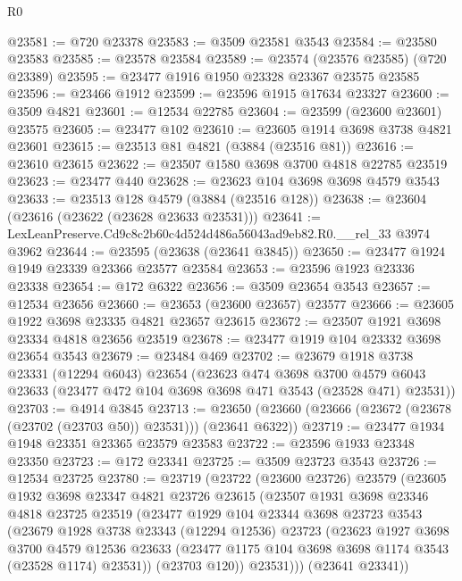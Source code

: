\begin{lexlean}{R0}
\begin{coremodule}
@23581 := @720 @23378
@23583 := @3509 @23581 @3543
@23584 := @23580 @23583
@23585 := @23578 @23584
@23589 := @23574 (@23576 @23585) (@720 @23389)
@23595 := @23477 @1916 @1950 @23328 @23367 @23575 @23585
@23596 := @23466 @1912
@23599 := @23596 @1915 @17634 @23327
@23600 := @3509 @4821
@23601 := @12534 @22785
@23604 := @23599 (@23600 @23601) @23575
@23605 := @23477 @102
@23610 := @23605 @1914 @3698 @3738 @4821 @23601
@23615 := @23513 @81 @4821 (@3884 (@23516 @81))
@23616 := @23610 @23615
@23622 := @23507 @1580 @3698 @3700 @4818 @22785 @23519
@23623 := @23477 @440
@23628 := @23623 @104 @3698 @3698 @4579 @3543
@23633 := @23513 @128 @4579 (@3884 (@23516 @128))
@23638 := @23604 (@23616 (@23622 (@23628 @23633 @23531)))
@23641 := LexLeanPreserve.Cd9c8c2b60c4d524d486a56043ad9eb82.R0.__rel_33 @3974 @3962
@23644 := @23595 (@23638 (@23641 @3845))
@23650 := @23477 @1924 @1949 @23339 @23366 @23577 @23584
@23653 := @23596 @1923 @23336 @23338
@23654 := @172 @6322
@23656 := @3509 @23654 @3543
@23657 := @12534 @23656
@23660 := @23653 (@23600 @23657) @23577
@23666 := @23605 @1922 @3698 @23335 @4821 @23657 @23615
@23672 := @23507 @1921 @3698 @23334 @4818 @23656 @23519
@23678 := @23477 @1919 @104 @23332 @3698 @23654 @3543
@23679 := @23484 @469
@23702 := @23679
    @1918
    @3738
    @23331
    (@12294 @6043)
    @23654
    (@23623
      @474
      @3698
      @3700
      @4579
      @6043
      @23633
      (@23477 @472 @104 @3698 @3698 @471 @3543 (@23528 @471) @23531))
@23703 := @4914 @3845
@23713 := @23650 (@23660 (@23666 (@23672 (@23678 (@23702 (@23703 @50)) @23531))) (@23641 @6322))
@23719 := @23477 @1934 @1948 @23351 @23365 @23579 @23583
@23722 := @23596 @1933 @23348 @23350
@23723 := @172 @23341
@23725 := @3509 @23723 @3543
@23726 := @12534 @23725
@23780 := @23719
    (@23722
      (@23600 @23726)
      @23579
      (@23605
        @1932
        @3698
        @23347
        @4821
        @23726
        @23615
        (@23507
          @1931
          @3698
          @23346
          @4818
          @23725
          @23519
          (@23477
            @1929
            @104
            @23344
            @3698
            @23723
            @3543
            (@23679
              @1928
              @3738
              @23343
              (@12294 @12536)
              @23723
              (@23623
                @1927
                @3698
                @3700
                @4579
                @12536
                @23633
                (@23477 @1175 @104 @3698 @3698 @1174 @3543 (@23528 @1174) @23531))
              (@23703 @120))
            @23531)))
      (@23641 @23341))

\end{coremodule}
\end{lexlean}
